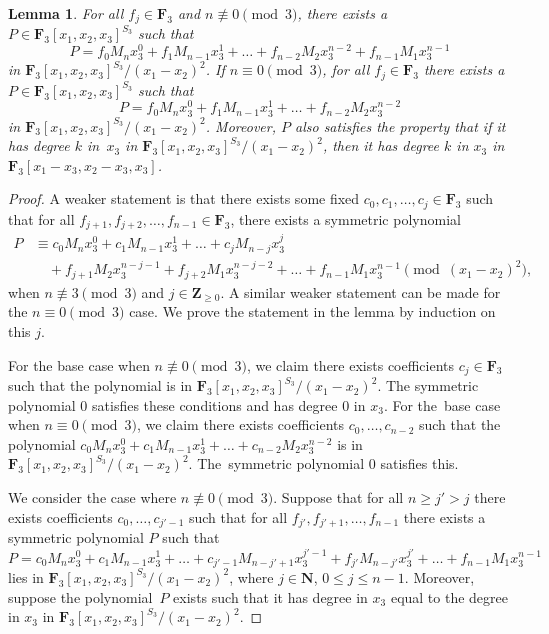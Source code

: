 \documentclass[11pt]{article}
\numberwithin{equation}{section}
\newtheorem{Lemma}[Theorem]{Lemma}
\theoremstyle{definition}
\numberwithin{equation}{section}
\begin{document}
\begin{Lemma}\label{symAll}
 For all $f_j\in \mathbf{F}_3$ and $n\not\equiv 0\pmod{3}$, there exists a $P\in \mathbf{F}_3[x_1,x_2,x_3]^{S_3}$ such that
 \[P= f_0M_nx_3^0+f_1M_{n-1}x_3^1+\dots + f_{n-2}M_2x_3^{n-2}+f_{n-1}M_1x_3^{n-1}\]
 in $\mathbf{F}_3[x_1,x_2,x_3]^{S_3}/(x_1-x_2)^2$. If $n\equiv 0\pmod{3}$, for all $f_j\in \mathbf{F}_3$ there exists a $P\in \mathbf{F}_3[x_1,x_2,x_3]^{S_3}$ such that
 \[P= f_0M_nx_3^0+f_1M_{n-1}x_3^1+\dots + f_{n-2}M_2x_3^{n-2}\]
 in $\mathbf{F}_3[x_1,x_2,x_3]^{S_3}/(x_1-x_2)^2$. Moreover, $P$ also satisfies the property that if it has degree $k$ in~$x_3$ in $\mathbf{F}_3[x_1,x_2,x_3]^{S_3}/(x_1-x_2)^2$, then it has degree $k$ in $x_3$ in $\mathbf{F}_3[x_1-x_3,x_2-x_3,x_3]$.
\end{Lemma}
\begin{proof}
 A weaker statement is that there exists some fixed $c_0, c_1, \dots, c_j\in\mathbf{F}_3$ such that for all $f_{j+1},f_{j+2},\dots,f_{n-1}\in \mathbf{F}_3$, there exists a symmetric polynomial
 \begin{align*}
 P&\equiv c_0M_nx_3^0+c_1M_{n-1}x_3^1+\dots + c_jM_{n-j}x_3^j\\
 &\quad +f_{j+1}M_2x_3^{n-j-1}+f_{j+2}M_1x_3^{n-j-2}+\dots+ f_{n-1}M_1x_3^{n-1}\pmod{(x_1-x_2)^2},
 \end{align*}
 when $n\not\equiv 3\pmod{3}$ and $j\in \mathbf{Z}_{\geq 0}$. A similar weaker statement can be made for the $n\equiv 0\pmod{3}$ case. We prove the statement in the lemma by induction on this $j$.

 For the base case when $n\not\equiv 0\pmod{3}$, we claim there exists coefficients $c_j\in \mathbf{F}_3$ such that the polynomial  is in $\mathbf{F}_3[x_1,x_2,x_3]^{S_3}/(x_1-x_2)^2$. The symmetric polynomial $0$ satisfies these conditions and has degree $0$ in $x_3$. For the~base case when $n\equiv 0\pmod{3}$, we claim there exists coefficients $c_0,\dots,c_{n-2}$ such that the polynomial $c_0M_nx_3^0+c_1M_{n-1}x_3^1+\dots + c_{n-2}M_2x_3^{n-2}$ is in $\mathbf{F}_3[x_1,x_2,x_3]^{S_3}/(x_1-x_2)^2$. The~symmetric polynomial $0$ satisfies this.

 We consider the case where $n\not\equiv 0\pmod{3}$. Suppose that for all $n\geq j'>j$ there exists coefficients $c_0,\dots,c_{j'-1}$ such that for all $f_{j'},f_{j'+1},\dots, f_{n-1}$ there exists a symmetric polynomial $P$ such that
 \[P = c_0M_nx_3^0+c_1M_{n-1}x_3^1+\dots + c_{j'-1}M_{n-j'+1}x_3^{j'-1}+f_{j'}M_{n-j'}x_3^{j'}+\dots + f_{n-1}M_1x_3^{n-1}\]
 lies in $\mathbf{F}_3[x_1,x_2,x_3]^{S_3}/(x_1-x_2)^2$, where $j\in \mathbf{N}$, $0\leq j\leq n-1$. Moreover, suppose the polynomial~$P$ exists such that it has degree in $x_3$ equal to the degree in $x_3$ in $\mathbf{F}_3[x_1,x_2,x_3]^{S_3}/(x_1-x_2)^2$.


\end{proof}
\end{document}

